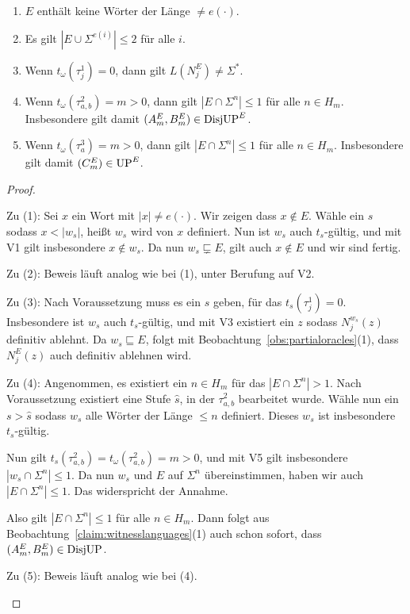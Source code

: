 \begin{claim}\label{claim:myoracle-structure}
    \begin{enumerate}[midpenalty=0,beginpenalty=0,endpenalty=0]
        \item $E$ enthält keine Wörter der Länge $\neq e(\cdot)$.
        \item Es gilt $|E\cup\Sigma^{e(i)}|\leq 2$ für alle $i$.
        \item Wenn $t_\omega(\tau^1_j)=0$, dann gilt $L(N_j^E)\neq\Sigma^*$.
        \item Wenn $t_\omega(\tau^2_{a,b})=m>0$, dann gilt $|E\cap \Sigma^n|\leq 1$ für alle $n\in H_m$. Insbesondere gilt damit $(A_m^E, B_m^E)\in\mathrm{DisjUP}^E$.
        \item Wenn $t_\omega(\tau^3_{a})=m>0$, dann gilt $|E\cap \Sigma^n|\leq 1$ für alle $n\in H_m$. Insbesondere gilt damit $(C_m^E)\in\mathrm{UP}^E$.
    \end{enumerate}
\end{claim}
\begin{proof}
    \begin{prooflist}
    \item Zu (1): Sei $x$ ein Wort mit $|x|\neq e(\cdot)$. Wir zeigen dass $x\not\in E$.  Wähle ein $s$ sodass $x<|w_s|$, heißt $w_s$ wird von $x$ definiert. Nun ist $w_s$ auch $t_s$-gültig, und mit V1 gilt insbesondere $x\not\in w_s$.
        Da nun $w_s\sqsubsetneq E$, gilt auch $x\not\in E$ und wir sind fertig.
        
    \item Zu (2): Beweis läuft analog wie bei (1), unter Berufung auf V2.

    \item Zu (3): Nach Voraussetzung muss es ein $s$ geben, für das $t_s(\tau^1_j)=0$. Insbesondere ist $w_s$ auch $t_s$-gültig, und mit V3 existiert ein $z$ sodass $N_j^{w_s}(z)$ definitiv ablehnt.
        Da $w_s\sqsubseteq E$, folgt mit Beobachtung~\ref{obs:partialoracles}(1), dass $N_j^E(z)$ auch definitiv ablehnen wird.

    \item Zu (4): Angenommen, es existiert ein $n\in H_m$ für das $|E\cap\Sigma^n|>1$.
        Nach Voraussetzung existiert eine Stufe $\hat{s}$, in der $\tau^2_{a,b}$ bearbeitet wurde.
        Wähle nun ein $s>\hat{s}$ sodass $w_s$ alle Wörter der Länge $\leq n$ definiert. Dieses $w_s$ ist insbesondere $t_s$-gültig.

        Nun gilt $t_s(\tau^2_{a,b})=t_\omega(\tau^2_{a,b})=m>0$, und mit V5 gilt insbesondere $|w_s\cap\Sigma^n|\leq 1$.
        Da nun $w_s$ und $E$ auf $\Sigma^{n}$ übereinstimmen, haben wir auch $|E\cap\Sigma^n|\leq 1$. Das widerspricht der Annahme.

        Also gilt $|E\cap\Sigma^n|\leq 1$ für alle $n\in H_m$. Dann folgt aus Beobachtung~\ref{claim:witnesslanguages}(1) auch schon sofort, dass $(A_m^E, B_m^E)\in\mathrm{DisjUP}$.

    \item Zu (5): Beweis läuft analog wie bei (4).
    \end{prooflist}
\end{proof}

